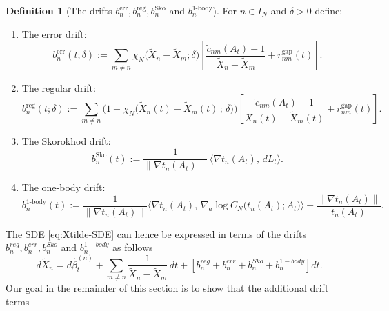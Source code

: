 \documentclass[12pt,reqno]{amsart}
\theoremstyle{plain}
\theoremstyle{definition}
\newtheorem{dfn}{Definition}[section]   %
\theoremstyle{remark}
\begin{document}
\begin{dfn}[The drifts $b_n^{\mathrm{err}}, b_n^{\mathrm{reg}}, b_n^{\mathrm{Sko}}$ and $b_n^{\mathrm{1\text{-}body}}$] 
\label{lem:cutoff-decomp}
For $n \in I_N$ and $\delta>0$ define:

\begin{enumerate}

\item The error drift:
\begin{equation}\label{eq:berr-cut-def}
b^{\mathrm{err}}_{n}(t ;\delta )
:= \sum_{m \neq n}\chi_N\!\big(\widetilde X_n-\widetilde X_m ; \delta \big)
\left[
\frac{\widetilde c_{nm}(A_t)-1}{\widetilde X_n-\widetilde X_m}
+ r^{\mathrm{gap}}_{nm}(t)
\right].
\end{equation}

\item The regular drift:
\begin{equation}
b^{\mathrm{reg}}_{n}(t ; \delta)
:=\sum_{m \neq n}\Big(1-\chi_N\!\big(\widetilde X_n(t)-\widetilde X_m(t)\,;\,\delta \big)\Big)
     \left[
       \frac{\widetilde c_{nm}(A_t)-1}{\widetilde X_n(t)-\widetilde X_m(t)}
       + r^{\mathrm{gap}}_{nm}(t)
     \right].
\end{equation}

\item The Skorokhod drift:
\begin{equation} 
b_n^{\mathrm{Sko}}(t)
:=\frac{1}{\|\nabla t_n(A_t)\|}\,\langle \nabla t_n(A_t),\,dL_t\rangle.
\end{equation}

\item The one-body drift:
\begin{equation} 
\label{eq:1-body}
b_n^{\mathrm{1\text{-}body}}(t)
:=\frac{1}{\|\nabla t_n(A_t)\|}
   \Big\langle \nabla t_n(A_t),\,\nabla_a \log C_N \!\bigl(t_n(A_t);A_t\bigr)\Big\rangle
-\frac{\|\nabla t_n(A_t)\|}{t_n(A_t)}.
\end{equation}

\end{enumerate}
\end{dfn}
The SDE \eqref{eq:Xtilde-SDE} can hence be expressed in terms of the drifts $b^{reg}_n,b^{err}_n, b_n^{Sko}$ and $b^{1-body}_n$ as follows 
\begin{equation}
\label{eq:DBM-reg-err}
d\widetilde X_n
= d\hat\beta^{(n)}_t
+ \sum_{m \neq n}\frac{1}{\widetilde X_n-\widetilde X_m}\,dt+ \left [ b^{reg}_n+b^{err}_n+ b_n^{Sko}+b^{1-body}_n \right ] dt.
\end{equation}
Our goal in the remainder of this section is to show that the additional drift terms 
\end{document}
